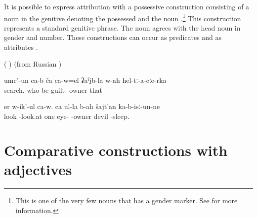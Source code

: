 It is possible to express attribution with a possessive construction consisting of a noun in the genitive denoting the possessed and the noun  .\footnote{This is one of the very few nouns that has a gender marker. See  for more information.} This construction represents a standard genitive phrase. The noun agrees with the head noun in gender and number. These constructions can occur as predicates  and as attributes .
%
\begin{exe}
	\ex	\label{ex:adjectivesWithBAH}
	\begin{xlist}
		\ex	{}  ( )
		\ex	{} 
		\ex	{}  (from Russian  )
	\end{xlist}
\end{exe}

\begin{exe}
	\ex	\label{ex:They are searching for who among them is guilty}
	\gll	umc'-un ca-b	ča 	ca-w=el	ʡaˁjb-la	w-ah	hel-tː-a-cːe-rka \\
		search. 	who	be	guilt	-owner	that- \\
	\glt	{}

	\ex	\label{ex:He is looking around}
	\gll	er w-ik'-ul ca-w.	ca	ul-la	b-ah	šajt'an	ka-b-isː-un-ne \\
		look -look.at 	 one	eye-	-owner	devil	-sleep. \\
	\glt	{}
\end{exe}



\section{Comparative constructions with adjectives}
\label{sec:Comparison}

